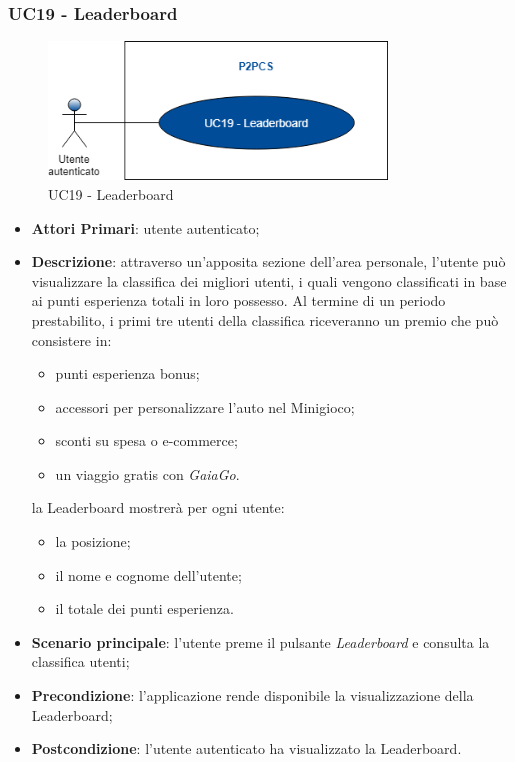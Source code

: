 \subsubsection{UC19 - Leaderboard}
\begin{figure}[h]
	\includegraphics[width=9cm]{res/images/UC22Leaderboard.png}
	\centering
	\caption{UC19 - Leaderboard}
\end{figure}
\begin{itemize}
	\item \textbf{Attori Primari}: utente autenticato;
	\item \textbf{Descrizione}: attraverso un'apposita sezione dell'area personale, l'utente può visualizzare la classifica dei migliori utenti, i quali vengono classificati in base ai punti esperienza totali in loro possesso. Al termine di un periodo prestabilito, i primi tre utenti della classifica riceveranno un premio che può consistere in:
	\begin{itemize}
		\item punti esperienza bonus;
		\item accessori per personalizzare l'auto nel Minigioco;
		\item sconti su spesa o e-commerce;
		\item un viaggio gratis con \textit{GaiaGo}.
	\end{itemize}
	la Leaderboard mostrerà per ogni utente:
	\begin{itemize}
		\item la posizione;
		\item il nome e cognome dell'utente;
		\item il totale dei punti esperienza.
	\end{itemize}
	\item \textbf{Scenario principale}: l'utente preme il pulsante \textit{Leaderboard} e consulta la classifica utenti;
	\item \textbf{Precondizione}: l'applicazione rende disponibile la visualizzazione della Leaderboard\glo;
	\item \textbf{Postcondizione}: l'utente autenticato ha visualizzato la Leaderboard.
\end{itemize}

